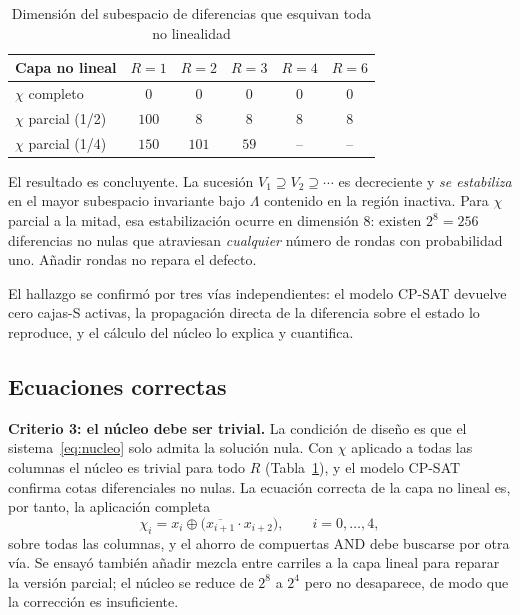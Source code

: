\documentclass[conference]{IEEEtran}
\newcommand{\xor}{\oplus}
\begin{document}
\begin{table}[t]
\caption{Dimensión del subespacio de diferencias que esquivan toda no linealidad}
\label{tab:nucleo}
\centering
\begin{tabular}{@{}lccccc@{}}
\toprule
Capa no lineal & $R{=}1$ & $R{=}2$ & $R{=}3$ & $R{=}4$ & $R{=}6$ \\
\midrule
$\chi$ completo           & $0$      & $0$    & $0$   & $0$   & $0$ \\
$\chi$ parcial (1/2)      & $100$    & $8$    & $8$   & $8$   & $8$ \\
$\chi$ parcial (1/4)      & $150$    & $101$  & $59$  & --    & -- \\
\bottomrule
\end{tabular}
\end{table}

El resultado es concluyente. La sucesión $V_1 \supseteq V_2 \supseteq \cdots$ es
decreciente y \emph{se estabiliza} en el mayor subespacio invariante bajo
$\Lambda$ contenido en la región inactiva. Para $\chi$ parcial a la mitad, esa
estabilización ocurre en dimensión $8$: existen $2^{8} = 256$ diferencias no nulas
que atraviesan \emph{cualquier} número de rondas con probabilidad uno. Añadir
rondas no repara el defecto.

El hallazgo se confirmó por tres vías independientes: el modelo CP-SAT devuelve
cero cajas-S activas, la propagación directa de la diferencia sobre el estado lo
reproduce, y el cálculo del núcleo lo explica y cuantifica.

\subsection{Ecuaciones correctas}

\textbf{Criterio 3: el núcleo debe ser trivial.} La condición de diseño es que el
sistema~\eqref{eq:nucleo} solo admita la solución nula. Con $\chi$ aplicado a todas
las columnas el núcleo es trivial para todo $R$ (Tabla~\ref{tab:nucleo}), y el
modelo CP-SAT confirma cotas diferenciales no nulas. La ecuación correcta de la
capa no lineal es, por tanto, la aplicación completa
\begin{equation}
\chi_i = x_i \xor \bigl(\overline{x_{i+1}} \cdot x_{i+2}\bigr),
\qquad i = 0,\dots,4,
\end{equation}
sobre todas las columnas, y el ahorro de compuertas AND debe buscarse por otra vía.
Se ensayó también añadir mezcla entre carriles a la capa lineal para reparar la
versión parcial; el núcleo se reduce de $2^{8}$ a $2^{4}$ pero no desaparece, de
modo que la corrección es insuficiente.
\end{document}
